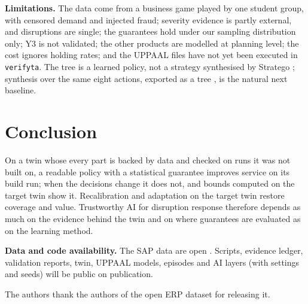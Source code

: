 \documentclass{ifacconf}
\begin{document}
\textbf{Limitations.} The data come from a business game played by one student group, with censored demand and
injected fraud; severity evidence is partly external, and disruptions are single; the guarantees hold under our
sampling distribution only; Y3 is not validated; the other products are modelled at planning level; the cost
ignores holding rates; and the UPPAAL files have not yet been executed in \texttt{verifyta}. The tree is a
learned policy, not a strategy synthesised by Stratego \citep{david2015stratego}; synthesis over the same eight
actions, exported as a tree \citep{ashok2020dtcontrol}, is the natural next baseline.

\section{Conclusion}

On a twin whose every part is backed by data and checked on runs it was not built on, a readable policy with
a statistical guarantee improves service on its build run; when the decisions change it does not, and bounds
computed on the target twin show it. Recalibration and adaptation on the target twin restore coverage
and value. Trustworthy AI for disruption response therefore depends as much on the evidence behind the twin and on
where guarantees are evaluated as on the learning method.

\textbf{Data and code availability.} The SAP data are open \citep{tritscher2022openerp}. Scripts, evidence ledger, validation
reports, twin, UPPAAL models, episodes and AI layers (with settings and seeds) will be public on publication.

\begin{ack}
The authors thank the authors of the open ERP dataset for releasing it.
\end{ack}


\end{document}
